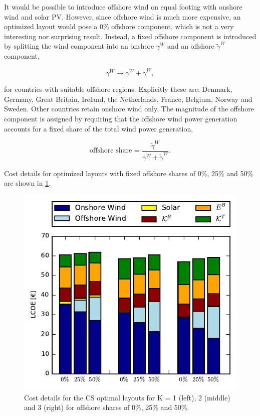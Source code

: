 \documentclass[a4paper, 5p, sort&compress]{elsarticle}%
\begin{document}
It would be possible to introduce offshore wind on equal footing with
onshore wind and solar PV. However, since offshore wind is much more
expensive, an optimized layout would pose a 0\% offshore component,
which is not a very interesting nor surprising result. Instead, a
fixed offshore component is introduced by splitting the wind component
into an onshore $\gamma^{W}$ and an offshore $\tilde{\gamma}^{W}$ component,

\begin{equation}
  \label{eq:11}
  \gamma^{W} \to \gamma^{W} + \tilde{\gamma}^{W}, 
\end{equation}

for countries with suitable offshore regions. Explicitly these are:
Denmark, Germany, Great Britain, Ireland, the Netherlands, France,
Belgium, Norway and Sweden. Other countries retain onshore wind
only. The magnitude of the offshore component is assigned by requiring
that the offshore wind power generation accounts for a fixed share of
the total wind power generation,

\begin{equation}
  \label{eq:12}
  \text{offshore share = }\frac{\tilde{\gamma}^W}{\gamma^{W} + \tilde{\gamma}^W}.
\end{equation}

Cost details for optimized layouts with fixed offshore shares of 0\%, 25\% and
50\% are shown in \cref{fig:cost-offshore}.

\begin{figure}[h!]
  \centering
  \includegraphics[width = \columnwidth]{costOffshoreVE50}
  \caption{Cost details for the CS optimal layouts for K = 1 (left),
    2 (middle) and 3 (right) for offshore shares of 0\%, 25\% and 50\%.}
  \label{fig:cost-offshore}
\end{figure}
\end{document}

